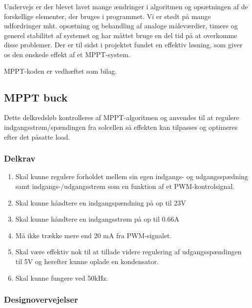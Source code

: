 \documentclass[../main.tex]{subfiles}
\begin{document}
    Undervejs er der blevet lavet mange ændringer i algoritmen og opsætningen af de forskellige elementer, der bruges i programmet. Vi er stødt på mange udfordringer mht. opsætning og behandling af analoge måleværdier, timere og generel stabilitet af systemet og har måttet bruge en del tid på at overkomme disse problemer. Der er til sidst i projektet fundet en effektiv løsning, som giver os den ønskede effekt af et MPPT-system.

    MPPT-koden er vedhæftet som bilag.


    \subsection{MPPT buck}
        Dette delkredsløb kontrolleres af MPPT-algoritmen og anvendes til at regulere indgangsstrøm/spændingen fra solcellen så effekten kan tilpasses og optimeres efter det påsatte load.
        
        \subsubsection{Delkrav}

            \begin{enumerate}
                \item Skal kunne regulere forholdet mellem sin egen indgangs- og udgangsspædning samt indgangs-/udgangsstrøm som en funktion af et PWM-kontrolsignal.
                \item Skal kunne håndtere en indgangspændning på op til 23V
                \item Skal kunne håndtere en indgangsstrøm på op til 0.66A
                \item Må ikke trække mere end 20 mA fra PWM-signalet.
                \item Skal være effektiv nok til at tillade videre regulering af udgangsspændingen til 5V og herefter kunne oplade en kondensator.
                \item Skal kunne fungere ved 50kHz.
            \end{enumerate}
            
        \subsubsection{Designovervejelser}
            
\end{document}
